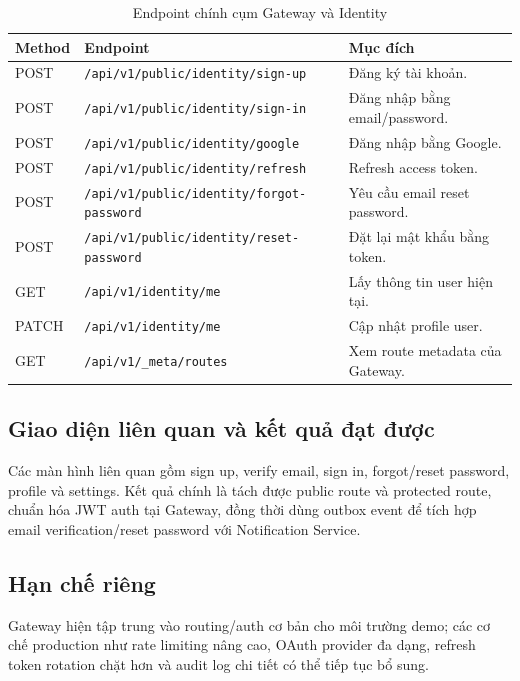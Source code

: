 \documentclass[14pt,a4paper,oneside]{extreport}
\begin{document}
\begin{table}[H]
\centering
\caption{Endpoint chính cụm Gateway và Identity}
\label{tab:endpoint-identity-gateway}
\renewcommand{\arraystretch}{1.3}
\scriptsize
\begin{tabularx}{\textwidth}{|l|l|X|}
\hline
\textbf{Method} & \textbf{Endpoint} & \textbf{Mục đích} \\
\hline
POST & \texttt{/api/v1/public/identity/sign-up} & Đăng ký tài khoản. \\
\hline
POST & \texttt{/api/v1/public/identity/sign-in} & Đăng nhập bằng email/password. \\
\hline
POST & \texttt{/api/v1/public/identity/google} & Đăng nhập bằng Google. \\
\hline
POST & \texttt{/api/v1/public/identity/refresh} & Refresh access token. \\
\hline
POST & \texttt{/api/v1/public/identity/forgot-password} & Yêu cầu email reset password. \\
\hline
POST & \texttt{/api/v1/public/identity/reset-password} & Đặt lại mật khẩu bằng token. \\
\hline
GET & \texttt{/api/v1/identity/me} & Lấy thông tin user hiện tại. \\
\hline
PATCH & \texttt{/api/v1/identity/me} & Cập nhật profile user. \\
\hline
GET & \texttt{/api/v1/\_meta/routes} & Xem route metadata của Gateway. \\
\hline
\end{tabularx}
\end{table}

\subsection{Giao diện liên quan và kết quả đạt được}

Các màn hình liên quan gồm sign up, verify email, sign in, forgot/reset password, profile và settings. Kết quả chính là tách được public route và protected route, chuẩn hóa JWT auth tại Gateway, đồng thời dùng outbox event để tích hợp email verification/reset password với Notification Service.

\subsection{Hạn chế riêng}

Gateway hiện tập trung vào routing/auth cơ bản cho môi trường demo; các cơ chế production như rate limiting nâng cao, OAuth provider đa dạng, refresh token rotation chặt hơn và audit log chi tiết có thể tiếp tục bổ sung.
\end{document}
